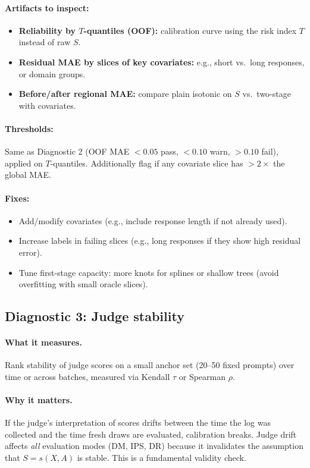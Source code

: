 \begin{enumerate}[resume]
\paragraph{Artifacts to inspect:}
\begin{itemize}
\item \textbf{Reliability by $T$-quantiles (OOF):} calibration curve using the risk index $T$ instead of raw $S$.
\item \textbf{Residual MAE by slices of key covariates:} e.g., short vs.\ long responses, or domain groups.
\item \textbf{Before/after regional MAE:} compare plain isotonic on $S$ vs.\ two-stage with covariates.
\end{itemize}

\paragraph{Thresholds:}
Same as Diagnostic 2 (OOF MAE $< 0.05$ pass, $< 0.10$ warn, $> 0.10$ fail), applied on $T$-quantiles. Additionally flag if any covariate slice has $> 2\times$ the global MAE.

\paragraph{Fixes:}
\begin{itemize}
\item Add/modify covariates (e.g., include response length if not already used).
\item Increase labels in failing slices (e.g., long responses if they show high residual error).
\item Tune first-stage capacity: more knots for splines or shallow trees (avoid overfitting with small oracle slices).
\end{itemize}

\subsection{Diagnostic 3: Judge stability}

\paragraph{What it measures.} Rank stability of judge scores on a small anchor set (20--50 fixed prompts) over time or across batches, measured via Kendall $\tau$ or Spearman $\rho$.

\paragraph{Why it matters.} If the judge's interpretation of scores drifts between the time the log was collected and the time fresh draws are evaluated, calibration breaks. Judge drift affects \emph{all} evaluation modes (DM, IPS, DR) because it invalidates the assumption that $S = s(X, A)$ is stable. This is a fundamental validity check.


\end{enumerate}

